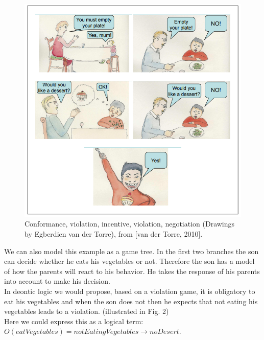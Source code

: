 \documentclass[conference]{IEEE}
\begin{document}
\begin{center}
\begin{figure}
    \centering
    \includegraphics[scale=0.7]{1.png}
    \caption{Conformance, violation, incentive, violation, negotiation (Drawings by
Egberdien van der Torre), from [van der Torre, 2010].}
    \label{fig:my_label}
\end{figure}
\end{center}

We can also model this example as a game tree. In the first two branches the son can decide whether he eats his vegetables or not. Therefore the son has a model of how the parents will react to his behavior. He takes the response of his parents into account to make his decision.\\
In deontic logic we would propose, based on a violation game, it is obligatory to eat his vegetables and when the son does not then he expects that not eating his vegetables leads to a violation. (illustrated in Fig. 2)\\
Here we could express this as a logical term:\\
$O(eatVegetables) = notEatingVegetables \to noDesert$.
\end{document}
